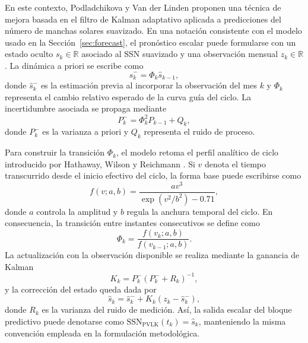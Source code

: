 En este contexto, Podladchikova y Van der Linden \citep{podladchikova2012kalman} proponen una técnica de mejora basada en el filtro de Kalman adaptativo aplicada a predicciones del número de manchas solares suavizado. En una notación consistente con el modelo usado en la Sección~\ref{sec:forecast}, el pronóstico escalar puede formularse con un estado oculto $s_k\in\mathbb{R}$ asociado al SSN suavizado y una observación mensual $z_k\in\mathbb{R}$. La dinámica a priori se escribe como
\begin{equation}
\widehat{s}_{k}^{-}=\Phi_k\widehat{s}_{k-1},
\end{equation}
donde $\widehat{s}_{k}^{-}$ es la estimación previa al incorporar la observación del mes $k$ y $\Phi_k$ representa el cambio relativo esperado de la curva guía del ciclo. La incertidumbre asociada se propaga mediante
\begin{equation}
P_k^{-}=\Phi_k^{2}P_{k-1}+Q_k,
\end{equation}
donde $P_k^{-}$ es la varianza a priori y $Q_k$ representa el ruido de proceso.

Para construir la transición $\Phi_k$, el modelo retoma el perfil analítico de ciclo introducido por Hathaway, Wilson y Reichmann \citep{hathaway2010solarcycle}. Si $v$ denota el tiempo transcurrido desde el inicio efectivo del ciclo, la forma base puede escribirse como
\begin{equation}
f(v;a,b)=\frac{a v^{3}}{\exp\!\left(v^{2}/b^{2}\right)-0.71},
\end{equation}
donde $a$ controla la amplitud y $b$ regula la anchura temporal del ciclo. En consecuencia, la transición entre instantes consecutivos se define como
\begin{equation}
\Phi_k=\frac{f(v_k;a,b)}{f(v_{k-1};a,b)}.
\end{equation}
La actualización con la observación disponible se realiza mediante la ganancia de Kalman
\begin{equation}
K_k=P_k^{-}\left(P_k^{-}+R_k\right)^{-1},
\end{equation}
y la corrección del estado queda dada por
\begin{equation}
\widehat{s}_{k}=\widehat{s}_{k}^{-}+K_k\left(z_k-\widehat{s}_{k}^{-}\right),
\end{equation}
donde $R_k$ es la varianza del ruido de medición. Así, la salida escalar del bloque predictivo puede denotarse como $\mathrm{SSN}_{\mathrm{PVLK}}(t_k)=\widehat{s}_{k}$, manteniendo la misma convención empleada en la formulación metodológica.

